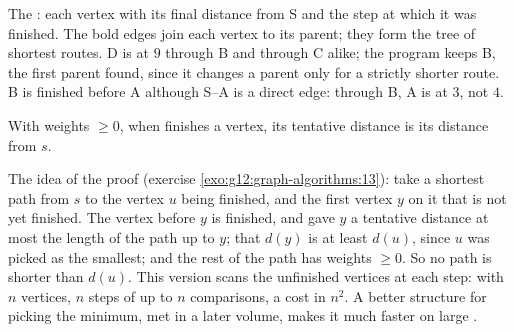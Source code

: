 \label{out:g12:graph-algorithms:dijkstra}

\begin{omfigure}

{\small The  : each vertex with its final distance from S and the step at which it was finished. The bold
edges join each vertex to its parent; they form the tree of shortest routes. D is at $9$ through B and through C alike; the program keeps B, the first
parent found, since it changes a parent only for a strictly shorter route. B is finished before A although S--A is
a direct edge: through B, A is at $3$, not $4$.}
\end{omfigure}

\begin{theorem}\label{thm:g12:graph-algorithms:dijkstra}
With weights $\ge 0$, when  finishes a vertex, its tentative distance is its distance from $s$.
\end{theorem}

The idea of the proof (exercise \ref{exo:g12:graph-algorithms:13}): take a shortest path from $s$ to the vertex $u$
being finished, and the first vertex $y$ on it that is not yet finished. The vertex before $y$ is
finished, and gave $y$ a tentative distance at most the length of the path up to $y$; that $d(y)$ is at least $d(u)$,
since $u$ was picked as the smallest; and the rest of the path has weights $\ge 0$. So
no path is shorter than $d(u)$. This version scans the unfinished vertices at each step: with $n$ vertices, $n$ steps
of up to $n$ comparisons, a cost in $n^2$. A better structure for picking the minimum, met in a later volume, makes
it much faster on large .

